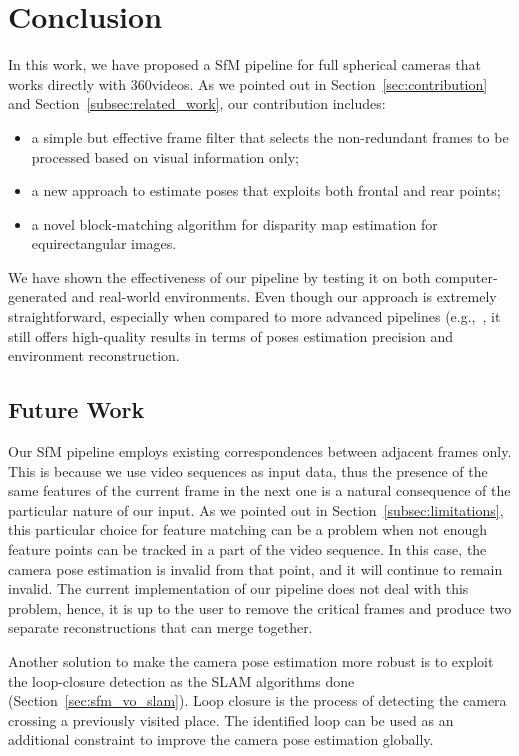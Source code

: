 \chapter{Conclusion}

In this work, we have proposed a SfM pipeline for full spherical cameras that works directly with 360\degree videos.
As we pointed out in Section~\ref{sec:contribution} and
Section~\ref{subsec:related_work}, our contribution includes:
%
\begin{itemize}
	\item a simple but effective frame filter that selects the non-redundant frames to be processed based on visual
	information only;
	\item a new approach to estimate poses that exploits both frontal and rear
	points;
	\item a novel block-matching algorithm for disparity map estimation for
	equirectangular images.
\end{itemize}
%
We have shown the effectiveness of our pipeline by testing it on 
both computer-generated and real-world environments.
Even though our approach is extremely straightforward, especially when compared to more advanced pipelines (e.g.,~\cite{schonberger2016structure}, it still offers high-quality results in terms of
poses estimation precision and environment reconstruction.

\section{Future Work}\label{sec:future_work}
Our SfM pipeline employs existing correspondences between adjacent frames only.
This is because we use video sequences as input data, thus the presence of
the same features of the current frame in the next one is a natural consequence
of the particular nature of our input.
As we pointed out in Section~\ref{subsec:limitations}, this particular choice
for feature matching can be a problem when not enough feature points can be
tracked in a part of the video sequence. In this case, the camera pose
estimation is invalid from that point, and it will continue to remain invalid.
The current implementation of our pipeline does not deal with this problem,
hence, it is up to the user to remove the critical frames and produce two
separate reconstructions that can merge together.

Another solution to make the camera pose estimation more robust is to 
exploit the loop-closure detection as the SLAM algorithms done (Section~\ref{sec:sfm_vo_slam}).
Loop closure is the process of detecting the camera crossing a previously
visited place. The identified loop can be used as an additional constraint
to improve the camera pose estimation globally.

